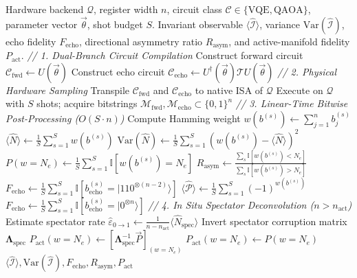 \documentclass[aps,pra,reprint,superscriptaddress,floatfix,nofootinbib]{revtex4-2}
\begin{document}
\begin{algorithm}[H]
\caption{AlgoInvar In Situ Benchmarking and Diagnostic Protocol}
\label{alg:algoinvar}
\begin{algorithmic}[1]
\Require Hardware backend $\mathcal{Q}$, register width $n$, circuit class $\mathcal{C} \in \{\text{VQE}, \text{QAOA}\}$, parameter vector $\vec{\theta}$, shot budget $S$.
\Ensure Invariant observable $\langle \hat{\mathcal{I}} \rangle$, variance $\text{Var}(\hat{\mathcal{I}})$, echo fidelity $F_{\text{echo}}$, directional asymmetry ratio $R_{\text{asym}}$, and active-manifold fidelity $P_{\text{act}}$.
\Statex \textit{// 1. Dual-Branch Circuit Compilation}
\State Construct forward circuit $\mathcal{C}_{\text{fwd}} \gets U(\vec{\theta})$
\State Construct echo circuit $\mathcal{C}_{\text{echo}} \gets U^\dagger(\vec{\theta}) \mathcal{T} U(\vec{\theta})$ 
\Statex \textit{// 2. Physical Hardware Sampling}
\State Transpile $\mathcal{C}_{\text{fwd}}$ and $\mathcal{C}_{\text{echo}}$ to native ISA of $\mathcal{Q}$
\State Execute on $\mathcal{Q}$ with $S$ shots; acquire bitstrings $\mathcal{M}_{\text{fwd}}, \mathcal{M}_{\text{echo}} \subset \{0, 1\}^n$
\Statex \textit{// 3. Linear-Time Bitwise Post-Processing ($O(S \cdot n)$)}
    \State Compute Hamming weight $w(b^{(s)}) \gets \sum_{j=1}^n b_j^{(s)}$
\EndFor
{} 
    \State $\langle \hat{N} \rangle \gets \frac{1}{S}\sum_{s=1}^S w(b^{(s)})$
    \State $\text{Var}(\hat{N}) \gets \frac{1}{S}\sum_{s=1}^S (w(b^{(s)}) - \langle \hat{N} \rangle)^2$
    \State $P(w = N_e) \gets \frac{1}{S} \sum_{s=1}^S \mathbb{I}[w(b^{(s)}) = N_e]$
    \State $R_{\text{asym}} \gets \frac{\sum_{s} \mathbb{I}[w(b^{(s)}) < N_e]}{\sum_{s} \mathbb{I}[w(b^{(s)}) > N_e]}$ 
    \State $F_{\text{echo}} \gets \frac{1}{S}\sum_{s=1}^S \mathbb{I}[b_{\text{echo}}^{(s)} = |110^{\otimes(n-2)}\rangle]$
 
    \State $\langle \hat{\mathcal{P}} \rangle \gets \frac{1}{S}\sum_{s=1}^S (-1)^{w(b^{(s)})}$
    \State $F_{\text{echo}} \gets \frac{1}{S}\sum_{s=1}^S \mathbb{I}[b_{\text{echo}}^{(s)} = |0^{\otimes n}\rangle]$
\EndIf
\Statex \textit{// 4. In Situ Spectator Deconvolution ($n > n_{\text{act}}$)}
    \State Estimate spectator rate $\hat{\varepsilon}_{0\to 1} \gets \frac{1}{n - n_{\text{act}}} \langle \hat{N}_{\text{spec}} \rangle$
    \State Invert spectator corruption matrix $\mathbf{\Lambda}_{\text{spec}}$
    \State $P_{\text{act}}(w = N_e) \gets [\mathbf{\Lambda}_{\text{spec}}^{-1} \vec{P}]_{(w=N_e)}$
\Else
    \State $P_{\text{act}}(w = N_e) \gets P(w = N_e)$
\EndIf
\State \Return $\langle \hat{\mathcal{I}} \rangle, \text{Var}(\hat{\mathcal{I}}), F_{\text{echo}}, R_{\text{asym}}, P_{\text{act}}$
\end{algorithmic}
\end{algorithm}
\end{document}
